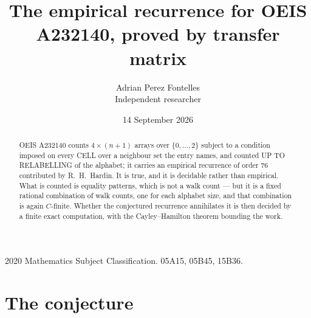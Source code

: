 \documentclass[11pt,a4paper]{article}
\title{The empirical recurrence for OEIS A232140, proved by transfer matrix}
\author{Adrian Perez Fontelles\\ \small Independent researcher}
\date{14 September 2026}
\theoremstyle{plain}
\theoremstyle{definition}
\begin{document}
\maketitle

\begin{abstract}
OEIS A232140 counts $4\times(n+1)$ arrays over $\{0,\dots,2\}$ subject to a condition imposed on
every CELL over a neighbour set the entry names, and counted UP TO RELABELLING of the
alphabet; it carries an empirical recurrence of order $76$ contributed by
R.~H.~Hardin. It is true, and it is decidable rather than empirical. What is counted is
equality patterns, which is not a walk count --- but it is a fixed rational combination of
walk counts, one for each alphabet size, and that combination is again $C$-finite. Whether the
conjectured recurrence annihilates it is then decided by a finite exact computation, with the
Cayley--Hamilton theorem bounding the work.
\end{abstract}

\noindent\small 2020 Mathematics Subject Classification. 05A15, 05B45, 15B36.\normalsize

\section{The conjecture}
\end{document}
